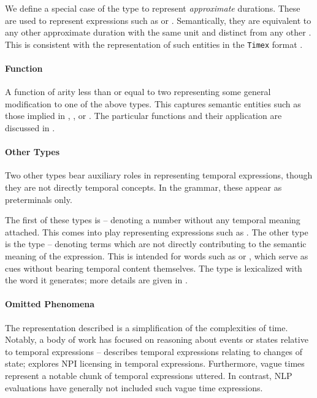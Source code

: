 We define a special case of the  type to represent 
	\textit{approximate} durations.
These are used to represent expressions such as  or
	.
Semantically, they are equivalent to any other approximate
	duration with the same unit and distinct from any other .
This is consistent with the representation of such entities in the
	\texttt{Timex} format \cite{key:2003pustejovsky-timeml}.

\paragraph{Function}
A function of arity less than or equal to two representing some
	general modification to one of the above types.
This captures semantic entities such as those implied in
	, , or .
The particular functions and their application are discussed in 
	.


\paragraph{Other Types}
Two other types bear auxiliary roles in representing temporal expressions,
	though they are not directly temporal concepts.
In the grammar, these appear as preterminals only.

The first of these types is  -- denoting a number without
	any temporal meaning attached.
This comes into play representing expressions such as .
The other type is the  type -- denoting terms which are not
	directly contributing to the semantic meaning of the expression.
This is intended for words such as  or , which serve as cues
	without bearing temporal content themselves.
The  type is lexicalized with the word it generates; more details
	are given in .


\paragraph{Omitted Phenomena}
The representation described is a simplification of the complexities of
	time.
Notably, a body of work has focused on reasoning about events or states
	relative to temporal expressions -- 
	 describes temporal expressions relating to
	changes of state; 
	 explores NPI licensing in temporal
	expressions.
Furthermore, vague times represent a notable chunk of temporal expressions
	uttered.
In contrast, NLP evaluations have generally not included such vague 
	time expressions.

